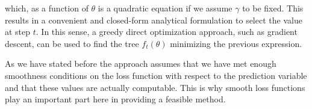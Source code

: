 \begin{appendices}
which, as a function of $\theta$ is a quadratic equation if we assume $\gamma$ to be fixed.
This results in a convenient and closed-form analytical formulation to select the value at step $t$.
In this sense, a greedy direct optimization approach, such as gradient descent, can be used to find the tree $f_t(\theta)$ minimizing the previous expression.

As we have stated before the approach assumes that we have met enough smoothness conditions on the loss function with respect to the prediction variable and that these values are actually computable.
This is why smooth loss functions play an important part here in providing a feasible method.






\end{appendices}
